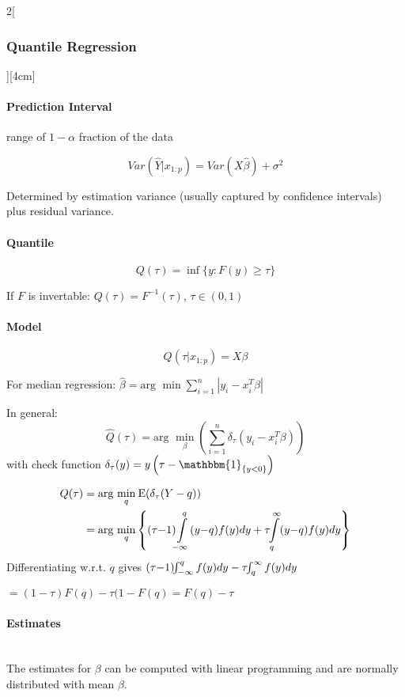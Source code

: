 \documentclass[8pt]{extarticle}
\begin{document}
\begin{multicols}{2}[\subsubsection{Quantile Regression}][4cm]

\paragraph{Prediction Interval} range of $1-\alpha$ fraction of the data

$$Var(\hat{Y}|x_{1:p}) = Var(X\hat{\beta}) + \sigma^2$$

\noindent Determined by estimation variance (usually captured by confidence intervals) plus residual variance.

\paragraph{Quantile}

$$Q(\tau) = \inf \{y:F(y)\geq\tau\}$$

If $F$ is invertable: $Q(\tau) =F^{-1}(\tau)$, $\tau\in (0,1)$


\paragraph{Model}

$$Q(\tau|x_{1:p}) = X\beta$$


\noindent For median regression: $\hat{\beta} = \text{arg } \min \sum_{i=1}^n \left| y_i - x_i^T\beta\right|$

In general: $$\hat{Q}(\tau) = \text{arg } \underset{\beta}{\min} \left( \sum_{i=1}^n \delta_\tau (y_i - x_i^T\beta)\right)$$
\indent with check function $\delta_\tau(y) = y\left(\tau - \mathbbm{1}_{\{y<0\}}\right)$

\begin{Proof}
\vspace{-1.5em}
\begin{align*}
Q(\tau) &=\text{arg }\underset{q}{\min}\:\mathrm{E}(\delta_\tau(Y-q))\\
&= 
\text{arg }\underset{q}{\min} \left\{ (\tau{-}1)\!\!\int\displaylimits_{-\infty}^q (y{-}q)f(y)dy + \tau\!\! \int\displaylimits_{q}^\infty (y{-}q)f(y)dy\right\}
\end{align*}
Differentiating w.r.t. $q$ gives $(\tau{-}1)\!\!\int\displaylimits_{-\infty}^q f(y)dy - \tau\!\! \int\displaylimits_{q}^\infty f(y)dy$

\noindent $= (1{-}\tau)F(q) - \tau(1{-}F(q) = F(q) -\tau$
\end{Proof}

\paragraph{Estimates} \ \\

\noindent The estimates for $\beta$ can be computed with linear programming and are normally distributed with mean $\beta$.

\end{multicols}
\end{document}
